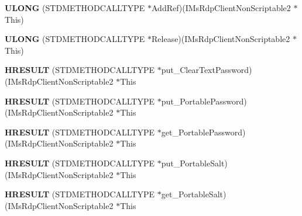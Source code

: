 \begin{DoxyCompactItemize}
{\bfseries U\+L\+O\+NG} (S\+T\+D\+M\+E\+T\+H\+O\+D\+C\+A\+L\+L\+T\+Y\+PE $\ast$Add\+Ref)(I\+Ms\+Rdp\+Client\+Non\+Scriptable2 $\ast$This)
\item 
\mbox{\label{struct_i_ms_rdp_client_non_scriptable2_vtbl_a4e96bfd2288140dd8f562e369f60f008}} 
{\bfseries U\+L\+O\+NG} (S\+T\+D\+M\+E\+T\+H\+O\+D\+C\+A\+L\+L\+T\+Y\+PE $\ast$Release)(I\+Ms\+Rdp\+Client\+Non\+Scriptable2 $\ast$This)
\item 
\mbox{\label{struct_i_ms_rdp_client_non_scriptable2_vtbl_aaee3232b123407de4556bb88d5ca31e0}} 
{\bfseries H\+R\+E\+S\+U\+LT} (S\+T\+D\+M\+E\+T\+H\+O\+D\+C\+A\+L\+L\+T\+Y\+PE $\ast$put\+\_\+\+Clear\+Text\+Password)(I\+Ms\+Rdp\+Client\+Non\+Scriptable2 $\ast$This
\item 
\mbox{\label{struct_i_ms_rdp_client_non_scriptable2_vtbl_a5dd3638c7e61b89e8e3d16a949b06082}} 
{\bfseries H\+R\+E\+S\+U\+LT} (S\+T\+D\+M\+E\+T\+H\+O\+D\+C\+A\+L\+L\+T\+Y\+PE $\ast$put\+\_\+\+Portable\+Password)(I\+Ms\+Rdp\+Client\+Non\+Scriptable2 $\ast$This
\item 
\mbox{\label{struct_i_ms_rdp_client_non_scriptable2_vtbl_a2c137807082120992b1aef9edd1c362f}} 
{\bfseries H\+R\+E\+S\+U\+LT} (S\+T\+D\+M\+E\+T\+H\+O\+D\+C\+A\+L\+L\+T\+Y\+PE $\ast$get\+\_\+\+Portable\+Password)(I\+Ms\+Rdp\+Client\+Non\+Scriptable2 $\ast$This
\item 
\mbox{\label{struct_i_ms_rdp_client_non_scriptable2_vtbl_ae2441a0a9beb1bd24494a9e4cc5f6ff2}} 
{\bfseries H\+R\+E\+S\+U\+LT} (S\+T\+D\+M\+E\+T\+H\+O\+D\+C\+A\+L\+L\+T\+Y\+PE $\ast$put\+\_\+\+Portable\+Salt)(I\+Ms\+Rdp\+Client\+Non\+Scriptable2 $\ast$This
\item 
\mbox{\label{struct_i_ms_rdp_client_non_scriptable2_vtbl_a1756904b65f387711d2c73a6aa93a670}} 
{\bfseries H\+R\+E\+S\+U\+LT} (S\+T\+D\+M\+E\+T\+H\+O\+D\+C\+A\+L\+L\+T\+Y\+PE $\ast$get\+\_\+\+Portable\+Salt)(I\+Ms\+Rdp\+Client\+Non\+Scriptable2 $\ast$This
\item 
\mbox{\label{struct_i_ms_rdp_client_non_scriptable2_vtbl_a3dc1c71fb85effbc750836e9ae408b5c}} 

\end{DoxyCompactItemize}
